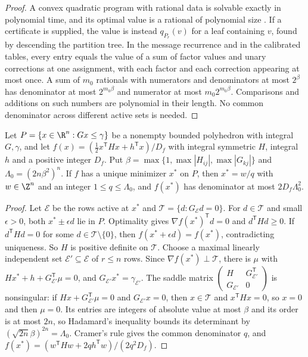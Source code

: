 \begin{proof}
A convex quadratic program with rational data is solvable exactly in
polynomial time, and its optimal value is a rational of polynomial size
\cite{KozlovTarasovKhachiyan1980}. If a certificate is supplied, the value is
instead $q_{P_r}(v)$ for a leaf containing $v$, found by descending the
partition tree. In the message recurrence and in the calibrated tables, every
entry equals the value of a sum of factor values and unary corrections at one
assignment, with each factor and each correction appearing at most once. A
sum of $m_0$ rationals with numerators and denominators at most $2^{\beta}$
has denominator at most $2^{m_0\beta}$ and numerator at most
$m_0 2^{m_0\beta}$. Comparisons and additions on such numbers are polynomial in
their length. No common denominator across different active sets is needed.
\end{proof}

\begin{lemma}\label{lem:cr-height}
Let $P=\{x\in\R^n:Gx\le\gamma\}$ be a nonempty bounded polyhedron with
integral $G,\gamma$, and let $f(x)=(\frac12x^{\mathsf T}Hx+h^{\mathsf T}x)/D_f$ with
integral symmetric $H$, integral $h$ and a positive integer $D_f$. Put
$\beta=\max\{1,\max|H_{ij}|,\max|G_{kj}|\}$ and
$\Lambda_0=(2n\beta^2)^n$. If $f$ has a unique minimizer $x^*$ on $P$, then
$x^*=w/q$ with $w\in\Z^n$ and an integer $1\le q\le\Lambda_0$, and $f(x^*)$ has
denominator at most $2D_f\Lambda_0^2$.
\end{lemma}

\begin{proof}
Let $\mathcal E$ be the rows active at $x^*$ and
$\mathcal T=\{d:G_{\mathcal E}d=0\}$. For $d\in\mathcal T$ and small
$\epsilon>0$, both $x^*\pm\epsilon d$ lie in $P$. Optimality gives
$\nabla f(x^*)^{\mathsf T}d=0$ and $d^{\mathsf T}Hd\ge0$. If
$d^{\mathsf T}Hd=0$ for some $d\in\mathcal T\setminus\{0\}$, then
$f(x^*+\epsilon d)=f(x^*)$, contradicting uniqueness. So $H$ is positive
definite on $\mathcal T$. Choose a maximal linearly independent set
$\mathcal E'\subseteq\mathcal E$ of $r\le n$ rows. Since
$\nabla f(x^*)\perp\mathcal T$, there is $\mu$ with
$Hx^*+h+G_{\mathcal E'}^{\mathsf T}\mu=0$, and $G_{\mathcal E'}x^*=\gamma_{\mathcal E'}$.
The saddle matrix
$\left(\begin{smallmatrix}H&G_{\mathcal E'}^{\mathsf T}\\G_{\mathcal E'}&0\end{smallmatrix}\right)$
is nonsingular: if $Hx+G_{\mathcal E'}^{\mathsf T}\mu=0$ and $G_{\mathcal E'}x=0$,
then $x\in\mathcal T$ and $x^{\mathsf T}Hx=0$, so $x=0$ and then $\mu=0$. Its
entries are integers of absolute value at most $\beta$ and its order is at most
$2n$, so Hadamard's inequality bounds its determinant by
$(\sqrt{2n}\beta)^{2n}=\Lambda_0$. Cramer's rule gives the common denominator
$q$, and $f(x^*)=(w^{\mathsf T}Hw+2qh^{\mathsf T}w)/(2q^2D_f)$.
\end{proof}

